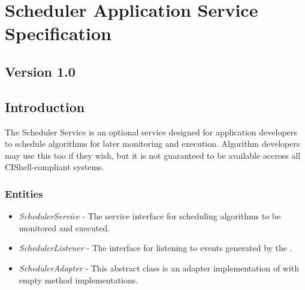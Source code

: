 \chapter{Scheduler Application Service Specification}

\section*{Version 1.0}

\section{Introduction}

The Scheduler Service is an optional service designed for application developers
to schedule algorithms for later monitoring and execution. Algorithm developers
may use this too if they wish, but it is not guaranteed to be available accross
all CIShell-compliant systems.

\subsection{Entities}

\begin{itemize}
  \item \textit{SchedulerService} - The service interface for scheduling
  algorithms to be monitored and executed.
  \item \textit{SchedulerListener} - The interface for listening to events
  generated by the .
  \item \textit{SchedulerAdapter} - This abstract class is an adapter
  implementation of  with empty method
  implementations.
\end{itemize}

\orgcishellappservicescheduler{}

